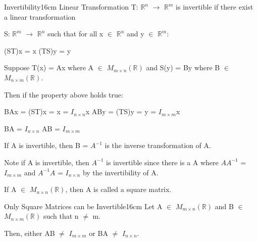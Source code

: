     \vspace{0.5cm}



    \begin{definition}{Invertibility}{16cm}
        Linear Transformation T: $\mathbb{R}^n$
        $\rightarrow$ $\mathbb{R}^m$
        is {\color{lblue} invertible} if there exist
        a linear transformation
        
        S: $\mathbb{R}^m$
        $\rightarrow$ $\mathbb{R}^n$ such that
        for all x $\in$ $\mathbb{R}^n$ and y $\in$ $\mathbb{R}^m$:

        \hspace{0.5cm}
        (ST)x = x
        \hspace{1cm}
        (TS)y = y

        Suppose T(x) = Ax where A $\in$ $M_{m \times n}(\mathbb{R})$
        and S(y) = By where B $\in$ $M_{n \times m}(\mathbb{R})$.
        
        Then if the property above holds true:

        \hspace{0.5cm}
        BAx = (ST)x = x = $I_{n \times n}$x
        \hspace{1cm}
        ABy = (TS)y = y = $I_{m \times m}$x

        \hspace{0.5cm}
        BA = $I_{n \times n}$
        \hspace{1cm}
        AB = $I_{m \times m}$

        If A is invertible, then B = $A^{-1}$ is the
        {\color{lblue} inverse transformation} of A.

        Note if A is invertible, then $A^{-1}$ is invertible
        since there is a A where $AA^{-1}$ = $I_{m \times m}$
        and $A^{-1}A$ = $I_{n \times n}$ by the invertibility of A.

        If A $\in$ $M_{n \times n}(\mathbb{R})$, then
        A is called a {\color{lblue} square matrix}.
    \end{definition}

    \newpage



    \begin{wtheorem}{Only Square Matrices can be Invertible}{16cm}
        Let A $\in$ $M_{m \times n}(\mathbb{R})$
        and B $\in$ $M_{n \times m}(\mathbb{R})$
        such that n $\not =$ m.
        
        Then, either AB $\not =$ $I_{m \times m}$
        or BA $\not =$ $I_{n \times n}$.
    \end{wtheorem}

